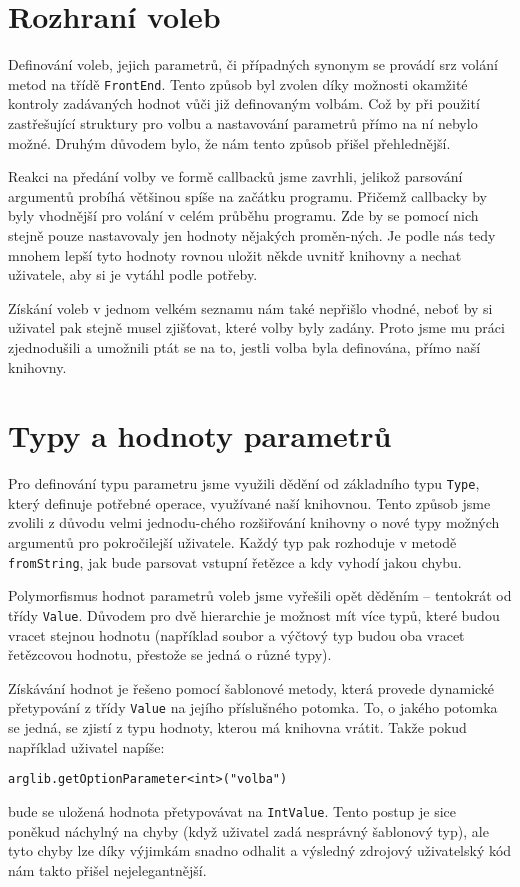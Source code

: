 \documentclass[a4paper,10pt]{article}
\begin{document}
\section*{Rozhraní voleb}

Definování voleb, jejich parametrů, či případných synonym se provádí srz volání metod na třídě \verb|FrontEnd|. Tento způsob
byl zvolen díky možnosti okamžité kontroly zadávaných hodnot vůči již definovaným volbám. Což by při použití
zastřešující struktury pro volbu a nastavování parametrů přímo na ní nebylo možné. Druhým důvodem bylo, že nám tento
způsob přišel přehlednější. 

Reakci na předání volby ve formě callbacků jsme zavrhli, jelikož parsování argumentů probíhá většinou spíše na začátku
programu. Přičemž callbacky by byly vhodnější pro volání v celém průběhu programu. Zde by se pomocí nich stejně
pouze nastavovaly jen hodnoty nějakých proměn-ných. Je podle nás tedy mnohem lepší tyto hodnoty rovnou uložit někde
uvnitř knihovny a nechat uživatele, aby si je vytáhl podle potřeby.

Získání voleb v jednom velkém seznamu nám také nepřišlo vhodné, neboť by si uživatel pak stejně musel zjišťovat, které
volby byly zadány. Proto jsme mu práci zjednodušili a umožnili ptát se na to, jestli volba byla definována, přímo naší knihovny.

\section*{Typy a hodnoty parametrů}

Pro definování typu parametru jsme využili dědění od základního typu \verb|Type|, který definuje potřebné operace,
využívané naší knihovnou. Tento způsob jsme zvolili z důvodu velmi jednodu-chého rozšiřování knihovny o nové typy
možných argumentů pro pokročilejší uživatele. Každý typ pak rozhoduje v metodě \verb|fromString|, jak bude parsovat
vstupní řetězce a kdy vyhodí jakou chybu.

Polymorfismus hodnot parametrů voleb jsme vyřešili opět děděním -- tentokrát od třídy \verb|Value|. Důvodem pro dvě
hierarchie je možnost mít více typů, které budou vracet stejnou hodnotu (například soubor a výčtový typ budou oba
vracet řetězcovou hodnotu, přestože se jedná o různé typy).

Získávání hodnot je řešeno pomocí šablonové metody, která provede dynamické přetypování z třídy \verb|Value| na jejího příslušného
potomka. To, o jakého potomka se jedná, se zjistí z typu hodnoty, kterou má knihovna vrátit. Takže pokud například
uživatel napíše:
\begin{verbatim}arglib.getOptionParameter<int>("volba")\end{verbatim}
bude se uložená hodnota přetypovávat na \verb|IntValue|. Tento
postup je sice poněkud náchylný na chyby (když uživatel zadá nesprávný šablonový typ), ale tyto chyby lze díky výjimkám
snadno odhalit a výsledný zdrojový uživatelský kód nám takto přišel nejelegantnější.
\end{document}
